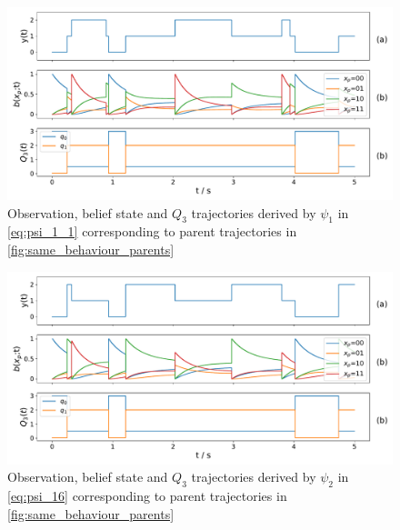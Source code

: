 \begin{figure}[H]
	\begin{center}
		\includegraphics[width=.90\textwidth]{figures/equivalence_classes/same_behaviour/psi_0}
		\caption{Observation, belief state and $ Q_3 $ trajectories derived by $ \psi_1 $ in \autoref{eq:psi_1_1} corresponding to parent trajectories in \autoref{fig:same_behaviour_parents}}
		\label{fig:same_behaviour_psi_0}
	\end{center}
\end{figure}
\begin{figure}[H]
	\begin{center}
		\includegraphics[width=.90\textwidth]{figures/equivalence_classes/same_behaviour/psi_16}
		\caption{Observation, belief state and $ Q_3 $ trajectories derived by $ \psi_2 $ in \autoref{eq:psi_16} corresponding to parent trajectories in \autoref{fig:same_behaviour_parents}}
		\label{fig:same_behaviour_psi_16}
	\end{center}
\end{figure}

